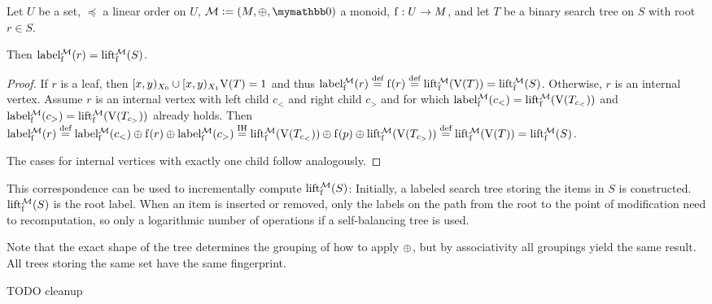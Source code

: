 \begin{proposition}
Let $U$ be a set, $\preceq$ a linear order on $U$, $\mathcal{M} \defeq (M, \groupaddsym, \neutraladd)$ a monoid, ${\operatorname{f}}: {U} \rightarrow {M}$, and let $T$ be a binary search tree on $S$ with root $r \in S$.

Then $\operatorname{label_{\operatorname{f}}^{\mathcal{M}}}(r) = \operatorname{lift_{\operatorname{f}}^{\mathcal{M}}}(S)$.

\begin{proof}
If $r$ is a leaf, then $[{x},{y})_{X_0} \cup [{x},{y})_{X_1}{\operatorname{V}(T)} = 1$ and thus $\operatorname{label_{\operatorname{f}}^{\mathcal{M}}}(r) \overset{\text{def}}= \operatorname{f}(r) \overset{\text{def}}= \operatorname{lift_{\operatorname{f}}^{\mathcal{M}}}(\operatorname{V}(T)) = \operatorname{lift_{\operatorname{f}}^{\mathcal{M}}}(S)$.
Otherwise, $r$ is an internal vertex. Assume $r$ is an internal vertex with left child $c_{<}$ and right child $c_{>}$ and for which $\operatorname{label_{\operatorname{f}}^{\mathcal{M}}}(c_{<}) = \operatorname{lift_{\operatorname{f}}^{\mathcal{M}}}(\operatorname{V}(T_{c_{<}}))$ and $\operatorname{label_{\operatorname{f}}^{\mathcal{M}}}(c_{>}) = \operatorname{lift_{\operatorname{f}}^{\mathcal{M}}}(\operatorname{V}(T_{c_{>}}))$ already holds. Then $\operatorname{label_{\operatorname{f}}^{\mathcal{M}}}(r) \overset{\text{def}}= {\operatorname{label_{\operatorname{f}}^{\mathcal{M}}}(c_{<})} \oplus {{\operatorname{f}(r)} \oplus{\operatorname{label_{\operatorname{f}}^{\mathcal{M}}}(c_{>})}} \overset{\text{IH}}= {\operatorname{lift_{\operatorname{f}}^{\mathcal{M}}}(\operatorname{V}(T_{c_{<}}))} \oplus {{\operatorname{f}(p)} \oplus{\operatorname{lift_{\operatorname{f}}^{\mathcal{M}}}(\operatorname{V}(T_{c_{>}}))}} \overset{\text{def}}= \operatorname{lift_{\operatorname{f}}^{\mathcal{M}}}(\operatorname{V}(T)) = \operatorname{lift_{\operatorname{f}}^{\mathcal{M}}}(S)$.

The cases for internal vertices with exactly one child follow analogously.
\end{proof}
\end{proposition}

This correspondence can be used to incrementally compute $\operatorname{lift_{\operatorname{f}}^{\mathcal{M}}}(S)$: Initially, a labeled search tree storing the items in $S$ is constructed. $\operatorname{lift_{\operatorname{f}}^{\mathcal{M}}}(S)$ is the root label. When an item is inserted or removed, only the labels on the path from the root to the point of modification need to recomputation, so only a logarithmic number of operations if a self-balancing tree is used.

Note that the exact shape of the tree determines the grouping of how to apply $\oplus$, but by associativity all groupings yield the same result. All trees storing the same set have the same fingerprint.


TODO cleanup



